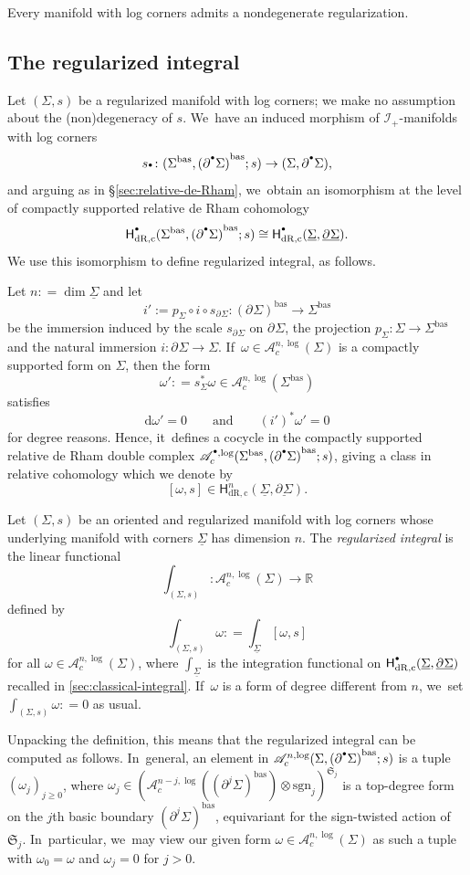 \documentclass[JEP,XML,SOM,Unicode,NoFloatCountersInSection,published]{cedram}
\let\oldbullet\bullet
\renewcommand{\bullet}{{\raisebox{1pt}{$\scriptscriptstyle\oldbullet$}}}
\theoremstyle{definition}
\theoremstyle{remark}
\let\defn\emph
\newcommand{\RR}{\mathbb{R}}
\renewcommand{\ge}{\geqslant}
\newcommand{\defas}{\mathrel{\mathop:}=}
\newcommand{\dd}{\mathrm{d}}
\newcommand{\Alogc}[2][\bullet]{\mathscr{A}^{#1,\log}_c(#2)}
\newcommand{\Sig}{\Sigma}
\newcommand{\uSig}{\underline{\Sigma}}
\newcommand{\bas}[1]{{#1}^{\mathrm{bas}}}
\newcommand{\Sigbas}{\bas{\Sig}}
\newcommand{\ubdSig}[1][]{\underline{\partial^{#1}\Sigma}}
\newcommand{\bdSig}[1][]{\partial^{#1}\Sigma}
\newcommand{\HdRc}[2][\bullet]{\mathsf{H}_{\mathrm{dR},\mathrm{c}}^{#1}(#2)}
\newcommand{\symgp}[1]{\mathfrak{S}_{#1}}
\newcommand{\sgn}[1]{\mathrm{sgn}_{#1}}
\newcommand{\ascat}{\mathscr{I}_+}
\begin{document}
\begin{corollary}
Every manifold with log corners admits a nondegenerate regularization.
\end{corollary}

\subsection{The regularized integral}
Let $(\Sig,s)$ be a regularized manifold with log corners; we make no assumption about the (non)degeneracy of $s$. We~have an induced morphism of $\ascat$-manifolds with log corners
\[
s_\bullet \colon (\Sigbas,\bas{(\bdSig[\bullet])};s) \to (\Sig,\bdSig[\bullet]),
\]
and arguing as in \S\ref{sec:relative-de-Rham}, we~obtain an isomorphism at the level of compactly supported relative de Rham cohomology
\[
\HdRc{\Sigbas,\bas{(\bdSig[\bullet])};s} \cong \HdRc{\uSig,\ubdSig}.
\]
We use this isomorphism to define regularized integral, as follows.

Let $n \defas \dim \uSig$ and let
\[
i' := p_{\Sig} \circ i \circ s_{\bdSig} : \bas{(\bdSig)} \to \Sigbas
\]
be the immersion induced by the scale $s_{\bdSig}$ on $\bdSig$, the projection $p_\Sig : \Sig \to \Sigbas$ and the natural immersion $i : \bdSig \to \Sig$. If~$\omega \in \Alogc[n]{\Sig}$ is a compactly supported form on $\Sig$, then the form
\[
\omega' \defas s_\Sig^*\omega \in \Alogc[n]{\Sigbas}
\]
satisfies
\[
\dd \omega' =0 \qquad \textrm{and} \qquad (i')^*\omega'= 0
\]
for degree reasons. Hence, it~defines a cocycle in the compactly supported relative de Rham double complex $\Alogc{\Sigbas,\bas{(\bdSig[\bullet])};s}$, giving a class in relative cohomology which we denote by
\[
[\omega,s] \in \HdRc[n]{\uSig,\ubdSig}.
\]

\begin{definition}\label{def:regularized-integral}
Let $(\Sig,s)$ be an oriented and regularized manifold with log corners whose underlying manifold with corners $\uSig$ has dimension $n$. The \defn{regularized integral} is the linear functional
\[
\int_{(\Sig,s)} \colon \Alogc[n]{\Sig} \to \RR
\]
defined by
\[
\int_{(\Sig,s)} \omega \defas \int_{\uSig}[\omega,s]
\]
for all $\omega \in \Alogc[n]{\Sig}$, where $\int_{\uSig}$ is the integration functional on $\HdRc{\uSig,\ubdSig}$ recalled in \autoref{sec:classical-integral}. If~$\omega$ is a form of degree different from $n$, we~set $\int_{(\Sig,s)}\omega \defas 0$ as usual.
\end{definition}

Unpacking the definition, this means that the regularized integral can be computed as follows. In~general, an element in $\Alogc[n]{\Sig,\bas{(\bdSig[\bullet])};s}$ is a tuple $(\omega_j)_{j \ge 0}$, where $\omega_j \in (\Alogc[n-j]{\bas{(\bdSig[j])}}\otimes \sgn{j})^{\symgp{j}}$ is a top-degree form on the $j$th basic boundary $\bas{(\bdSig[j])}$, equivariant for the sign-twisted action of $\symgp{j}$. In~particular, we~may view our given form $\omega \in \Alogc[n]{\Sig}$ as such a tuple with $\omega_0 = \omega$ and $\omega_j = 0$ for $j > 0$.
\end{document}
